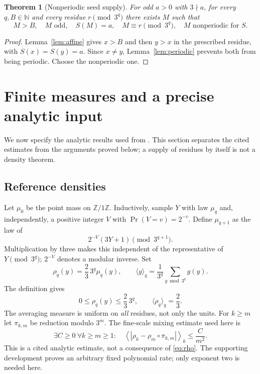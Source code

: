 \documentclass[11pt]{article}
\newtheorem{theorem}{Theorem}
\newcommand{\N}{\mathbb N}
\begin{document}
\begin{theorem}[Nonperiodic seed supply]\label{thm:supply}
For odd $a>0$ with $3\nmid a$, for every $q,B\in\N$ and every residue
$r\pmod{3^q}$ there exists $M$ such that
\begin{equation}\label{eq:supply}
 M>B,\quad M\text{ odd},\quad S(M)=a,\quad M\equiv r\pmod{3^q},
 \quad M\text{ nonperiodic for }S.
\end{equation}
\end{theorem}
\begin{proof}
Lemma~\ref{lem:affine} gives $x>B$ and then $y>x$ in the prescribed
residue, with $S(x)=S(y)=a$. Since $x\ne y$, Lemma~\ref{lem:periodic}
prevents both from being periodic. Choose the nonperiodic one.
\end{proof}

\section{Finite measures and a precise analytic input}
We now specify the analytic results used from \cite{mazur-density}.
This section separates the cited estimates from the arguments proved
below; a supply of residues by itself is not a density theorem.

\subsection{Reference densities}
Let $\mu_0$ be the point mass on $\mathbb Z/1\mathbb Z$.
Inductively, sample $Y$ with law $\mu_q$ and, independently, a positive
integer $V$ with $\Pr(V=v)=2^{-v}$. Define $\mu_{q+1}$ as the law of
\begin{equation}\label{eq:pmf}
 2^{-V}(3Y+1)\pmod{3^{q+1}}.
\end{equation}
Multiplication by three makes this independent of the representative
of $Y\pmod{3^q}$; $2^{-V}$ denotes a modular inverse.
Set
\[
 \rho_q(y)=\frac23\,3^q\mu_q(y),\qquad
 \langle g\rangle_q=\frac1{3^q}\sum_{y\bmod3^q}g(y).
\]
The definition gives
\begin{equation}\label{eq:rho}
 0\le\rho_q(y)\le\frac23\,3^q,\qquad
 \langle\rho_q\rangle_q=\frac23.
\end{equation}
The averaging measure is uniform on \emph{all} residues, not only the units.
For $k\ge m$ let $\pi_{k,m}$ be reduction modulo $3^m$.
The fine-scale mixing estimate used here is
\begin{equation}\label{eq:mixing}
 \exists C\ge0\ \forall k\ge m\ge1:\quad
 \left\langle\left|\rho_k-\rho_m\circ\pi_{k,m}\right|\right\rangle_k
 \le\frac{C}{m^2}.
\end{equation}
This is a cited analytic estimate, not a consequence of
\eqref{eq:rho}. The supporting development proves an arbitrary fixed
polynomial rate; only exponent two is needed here.
\end{document}

